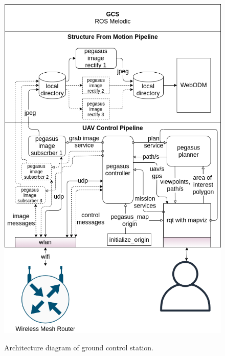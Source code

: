 \begin{figure}
	\centering
	\caption[Pegasus system overview]{\small Architecture diagram of ground control station.}
	\includegraphics[width=5in]{figures/methodology/methodology-gcs-components}
	\label{fig:gcs-components}
\end{figure}

